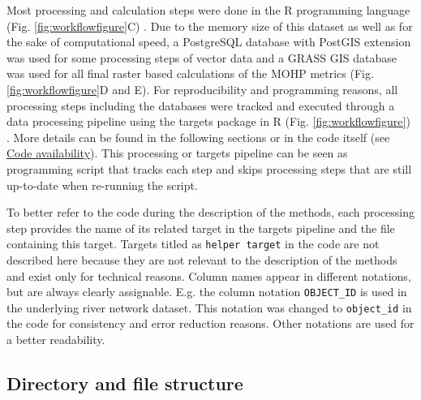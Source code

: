 \documentclass[fleqn,10pt]{wlscirep}
\begin{document}
Most processing and calculation steps were done in the R programming language (Fig. \ref{fig:workflowfigure}C) \cite{r_core_team_r_2020}. Due to the memory size of this dataset as well as for the sake of computational speed, a PostgreSQL database with PostGIS extension was used for some processing steps of vector data and a GRASS GIS database was used for all final raster based calculations of the MOHP metrics (Fig. \ref{fig:workflowfigure}D and E). For reproducibility and programming reasons, all processing steps including the databases were tracked and executed through a data processing pipeline using the targets package in R (Fig. \ref{fig:workflowfigure}) \cite{landau_targets_2021}. More details can be found in the following sections or in the code itself (see \protect\hyperlink{code-availability}{Code availability}). This processing or targets pipeline can be seen as programming script that tracks each step and skips processing steps that are still up-to-date when re-running the script.

To better refer to the code during the description of the methods, each processing step provides the name of its related target in the targets pipeline and the file containing this target. Targets titled as \texttt{helper\ target} in the code are not described here because they are not relevant to the description of the methods and exist only for technical reasons. Column names appear in different notations, but are always clearly assignable. E.g. the column notation \texttt{OBJECT\_ID} is used in the underlying river network dataset. This notation was changed to \texttt{object\_id} in the code for consistency and error reduction reasons. Other notations are used for a better readability.

\hypertarget{directory-and-file-structure}{%
\subsection*{Directory and file structure}\label{directory-and-file-structure}}
\end{document}

